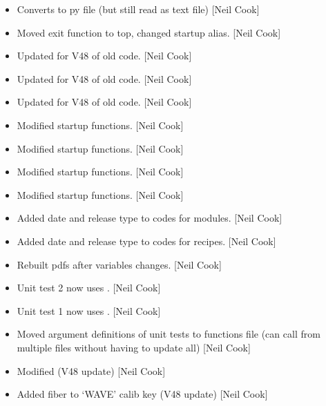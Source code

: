 \documentclass[a4paper,10pt,english]{report}
\begin{document}
\begin{itemize}
\item {} 
Converts to py file (but still read as text file) {[}Neil Cook{]}

\item {} 
Moved exit function to top, changed startup alias. {[}Neil Cook{]}

\item {} 
Updated for V48 of old code. {[}Neil Cook{]}

\item {} 
Updated for V48 of old code. {[}Neil Cook{]}

\item {} 
Updated for V48 of old code. {[}Neil Cook{]}

\item {} 
Modified startup functions. {[}Neil Cook{]}

\item {} 
Modified startup functions. {[}Neil Cook{]}

\item {} 
Modified startup functions. {[}Neil Cook{]}

\item {} 
Modified startup functions. {[}Neil Cook{]}

\item {} 
Added date and release type to codes for modules. {[}Neil Cook{]}

\item {} 
Added date and release type to codes for recipes. {[}Neil Cook{]}

\item {} 
Rebuilt pdfs after variables changes. {[}Neil Cook{]}

\item {} 
Unit test 2 now uses . {[}Neil Cook{]}

\item {} 
Unit test 1 now uses . {[}Neil Cook{]}

\item {} 
Moved argument definitions of unit tests to functions file (can call
from multiple files without having to update all) {[}Neil Cook{]}

\item {} 
Modified  (V48 update) {[}Neil Cook{]}

\item {} 
Added fiber to ‘WAVE’ calib key (V48 update) {[}Neil Cook{]}


\end{itemize}
\end{document}
